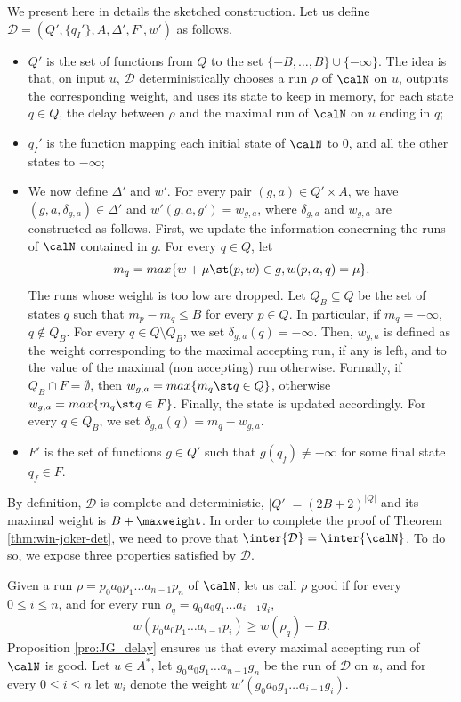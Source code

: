 \documentclass[a4paper]{article}
\begin{document}
We present here in details the sketched construction.
Let us define $\mathcal{D} = (Q', \{q_I'\}, A,\Delta', F',w')$ as follows.
\begin{itemize}[nolistsep]
	\item $Q'$ is the set of functions from $Q$ to the set $\{-B, \ldots, B
		\} \cup \{ - \infty \}$.  The idea is that, on input $u$,
		$\mathcal{D}$ deterministically chooses a run $\rho$ of $\calN$ on $u$, outputs
		the corresponding weight, and uses its state to keep in memory,
		for each state $q \in Q$, the delay between $\rho$ and the
		maximal run of $\calN$ on $u$ ending in $q$;
	\item $q_I'$ is the function mapping each initial state of $\calN$ to $0$,
		and all the other states to $- \infty$;
	\item We now define $\Delta'$ and $w'$.  For every pair $(g,a) \in Q'
		\times A$, we have $(g,a,\delta_{g,a}) \in \Delta'$ and
		$w'(g,a,g') = w_{g,a}$, where $\delta_{g,a}$ and $w_{g,a}$ are
		constructed as follows.  First, we update the information
		concerning the runs of $\calN$ contained in $g$.  For every $q
		\in Q$, let 
		\[
			m_q = max\{ w + \mu \st (p,w) \in g, w(p,a,q) = \mu \}.
		\]
		The runs whose weight is too low are dropped.  Let $Q_B
		\subseteq Q$ be the set of states $q$ such that $m_p-m_q \leq B$
		for every $p \in Q$. In particular, if $m_q = - \infty$, $q \notin Q_B$.
		For every $q \in Q \setminus Q_B$, we set
		$\delta_{g,a}(q) = - \infty$.  Then, $w_{g,a}$ is defined as the
		weight corresponding to the maximal accepting run, if any is
		left, and to the value of the maximal (non accepting) run
		otherwise.  Formally, if $Q_B \cap F = \emptyset$, then $w_{g,a}
		= max\{ m_q \st q \in Q \}$, otherwise $w_{g,a} = max\{ m_q \st q
		\in F \}$.  Finally, the state is updated accordingly.  For
		every $q \in Q_B$, we set $\delta_{g,a}(q) = m_q-w_{g,a}$.
	\item $F'$ is the set of functions $g \in Q'$ such that $g(q_f) \neq -
		\infty$ for some final state $q_f \in F$.
\end{itemize}



By definition, $\mathcal{D}$ is complete and deterministic, $|Q'| = (2B+2)^{|Q|}$ and its maximal weight is 
$B + \maxweight$.
 In order to complete
the proof of Theorem  \ref{thm:win-joker-det}, we need to prove that
$\inter{\mathcal{D}} = \inter{\calN}$.  To do so, we expose three properties
satisfied by $\mathcal{D}$.


Given a run $\rho = p_0 a_0 p_1 \ldots a_{n-1} p_n$ of $\calN$, let us call
$\rho$ good if for every $0 \leq i \leq n$, and for every run $\rho_q = q_0 a_0
q_1 \dots a_{i-1} q_i$,
\[w(p_0 a_0 p_1 \dots a_{i-1} p_i) \geq w(\rho_q) - B.\]
Proposition \ref{pro:JG_delay} ensures us that every maximal accepting run of
$\calN$ is good.  Let $u \in A^*$, let $g_0 a_0 g_1 \ldots a_{n-1} g_n$ be the
run of $\mathcal{D}$ on $u$, and for every $0 \leq i \leq n$ let $w_i$ denote
the weight $w'(g_0 a_0 g_1 \ldots a_{i-1} g_i)$.
\end{document}
